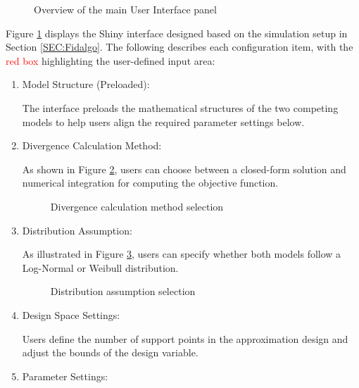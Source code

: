 \newpage

\begin{figure}[H]
    \caption{Overview of the main User Interface panel}
    \label{fig:Fidalgo-shiny1}
\end{figure}

\hspace*{8mm} Figure \ref{fig:Fidalgo-shiny1} displays the Shiny interface designed based on the simulation setup in Section \ref{SEC:Fidalgo}. The following describes each configuration item, with the \textcolor{red}{red box} highlighting the user-defined input area:

\begin{enumerate}
\item Model Structure (Preloaded): 

The interface preloads the mathematical structures of the two competing models to help users align the required parameter settings below.

\item Divergence Calculation Method: 

As shown in Figure \ref{fig:Fidalgo-shiny3}, users can choose between a closed-form solution and numerical integration for computing the objective function.

\begin{figure}[H]
    \caption{Divergence calculation method selection}
    \label{fig:Fidalgo-shiny3}
\end{figure}

\item Distribution Assumption: 

As illustrated in Figure \ref{fig:Fidalgo-shiny4}, users can specify whether both models follow a Log-Normal or Weibull distribution.

\begin{figure}[H]
    \caption{Distribution assumption selection}
    \label{fig:Fidalgo-shiny4}
\end{figure}

\item Design Space Settings: 

Users define the number of support points in the approximation design and adjust the bounds of the design variable.

\item Parameter Settings: 


\end{enumerate}
